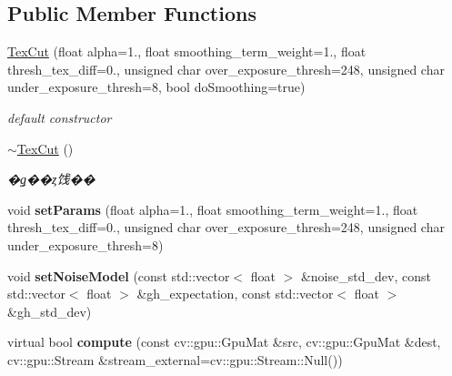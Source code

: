 \subsection*{Public Member Functions}
\begin{DoxyCompactItemize}
\item 
\hypertarget{classskl_1_1gpu_1_1_tex_cut_a19ec5fb7b9020127cacee0def7bae3ed}{}\label{classskl_1_1gpu_1_1_tex_cut_a19ec5fb7b9020127cacee0def7bae3ed} 
\hyperlink{classskl_1_1gpu_1_1_tex_cut_a19ec5fb7b9020127cacee0def7bae3ed}{Tex\+Cut} (float alpha=1., float smoothing\+\_\+term\+\_\+weight=1., float thresh\+\_\+tex\+\_\+diff=0., unsigned char over\+\_\+exposure\+\_\+thresh=248, unsigned char under\+\_\+exposure\+\_\+thresh=8, bool do\+Smoothing=true)
\begin{DoxyCompactList}\small\item\em default constructor \end{DoxyCompactList}\item 
\hypertarget{classskl_1_1gpu_1_1_tex_cut_a04f718d5961299b4131879487494182c}{}\label{classskl_1_1gpu_1_1_tex_cut_a04f718d5961299b4131879487494182c} 
\hyperlink{classskl_1_1gpu_1_1_tex_cut_a04f718d5961299b4131879487494182c}{$\sim$\+Tex\+Cut} ()
\begin{DoxyCompactList}\small\item\em �ǥ��ȥ饯�� \end{DoxyCompactList}\item 
\hypertarget{classskl_1_1gpu_1_1_tex_cut_a77cbff21b38d5691de210f2d298fea01}{}\label{classskl_1_1gpu_1_1_tex_cut_a77cbff21b38d5691de210f2d298fea01} 
void {\bfseries set\+Params} (float alpha=1., float smoothing\+\_\+term\+\_\+weight=1., float thresh\+\_\+tex\+\_\+diff=0., unsigned char over\+\_\+exposure\+\_\+thresh=248, unsigned char under\+\_\+exposure\+\_\+thresh=8)
\item 
\hypertarget{classskl_1_1gpu_1_1_tex_cut_a8a3bac8170db78b4438c61dac1b811e0}{}\label{classskl_1_1gpu_1_1_tex_cut_a8a3bac8170db78b4438c61dac1b811e0} 
void {\bfseries set\+Noise\+Model} (const std\+::vector$<$ float $>$ \&noise\+\_\+std\+\_\+dev, const std\+::vector$<$ float $>$ \&gh\+\_\+expectation, const std\+::vector$<$ float $>$ \&gh\+\_\+std\+\_\+dev)
\item 
\hypertarget{classskl_1_1gpu_1_1_tex_cut_a9f17e1a9801b5c7fbeb8a18913077700}{}\label{classskl_1_1gpu_1_1_tex_cut_a9f17e1a9801b5c7fbeb8a18913077700} 
virtual bool {\bfseries compute} (const cv\+::gpu\+::\+Gpu\+Mat \&src, cv\+::gpu\+::\+Gpu\+Mat \&dest, cv\+::gpu\+::\+Stream \&stream\+\_\+external=cv\+::gpu\+::\+Stream\+::\+Null())

\end{DoxyCompactItemize}

